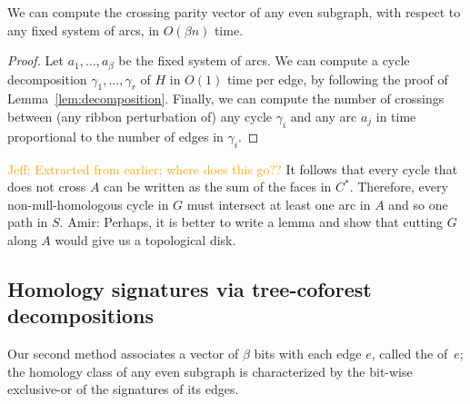 \documentclass[letterpaper,review]{siamart190516}
\def\anote#1{\color{purple}Amir: #1 \color{black}}
\def\jnote#1{\textcolor{orange}{Jeff: #1}}
\begin{document}
\begin{lemma}
We can compute the crossing parity vector of any even subgraph, with respect to any fixed system of arcs, in $O(\beta n)$ time.
\end{lemma}

\begin{proof}
Let $a_1,\dots, a_\beta$ be the fixed system of arcs. 
We can compute a cycle decomposition $\gamma_1, \dots, \gamma_r$ of $H$ in $O(1)$ time per edge, by following the proof of Lemma~\ref{lem:decomposition}.  Finally, we can compute the number of crossings between (any ribbon perturbation of) any cycle $\gamma_i$ and any arc $a_j$ in time proportional to the number of edges in $\gamma_i$.
\end{proof}

\jnote{Extracted from earlier; where does this go??}
It follows that every cycle that does not cross $A$ can be written as the sum of the faces in $C^*$.
Therefore, every non-null-homologous cycle in $G$ must intersect at least one arc in $A$ and so one path in $S$. \anote{Perhaps, it is better to write a lemma and show that cutting $G$ along $A$ would give us a topological disk.}




\subsection{Homology signatures via tree-coforest decompositions}
\label{sec:characterizing_signatures}

Our second method associates a vector of $\beta$ bits with each edge $e$, called the  of~$e$; the homology class of any even subgraph is characterized by the bit-wise exclusive-or of the signatures of its edges.
\end{document}
